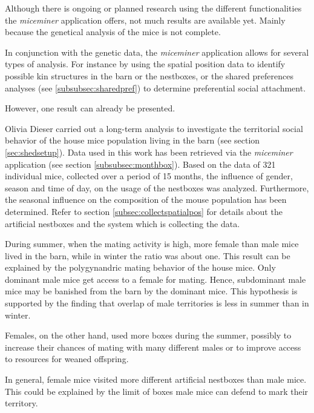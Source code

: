 Although there is ongoing or planned research using the different functionalities the \textit{miceminer} application offers, not much results are available yet. Mainly because the genetical analysis of the mice is not complete. 
 
In conjunction with the genetic data, the \textit{miceminer} application allows for several types of analysis. For instance by using the spatial position data to identify possible kin structures in the barn or the nestboxes, or the shared preferences analyses (see \ref{subsubsec:sharedpref}) to determine preferential social attachment. 
 
However, one result can already be presented.
 
Olivia Dieser \citep{dieser:08} carried out a long-term analysis to investigate the territorial social behavior of the house mice population living in the barn (see section \ref{sec:shedsetup}). Data used in this work has been retrieved via the \textit{miceminer} application (see section \ref{subsubsec:monthbox}). Based on the data of 321 individual mice, collected over a period of 15 months, the influence of gender, season and time of day, on the usage of the nestboxes was analyzed. Furthermore, the seasonal influence on the composition of the mouse population has been determined. Refer to section \ref{subsec:collectspatialpos} for details about the artificial nestboxes and the system which is collecting the data.
 
During summer, when the mating activity is high, more female than male mice lived in the barn, while in winter the ratio was about one. This result can be explained by the polygynandric mating behavior of the house mice. Only dominant male mice get access to a female for mating. Hence, subdominant male mice may be banished from the barn by the dominant mice. This hypothesis is supported by the finding that overlap of male territories is less in summer than in winter. 
 
Females, on the other hand, used more boxes during the summer, possibly to increase their chances of mating with many different males or to improve access to resources for weaned offspring.
 
In general, female mice visited more different artificial nestboxes than male mice. This could be explained by the limit of boxes male mice can defend to mark their territory.